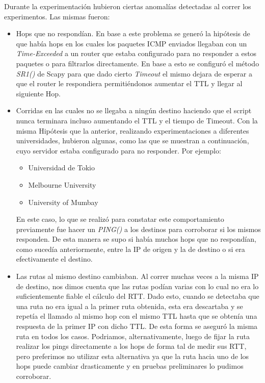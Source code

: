 Durante la experimentación hubieron ciertas anomalías detectadas al correr los experimentos. Las mismas fueron:

\begin{itemize}
    \item Hops que no respondían. En base a este problema se generó la hipótesis de que había hops en los cuales los paquetes ICMP enviados llegaban con un \textit{Time-Exceeded} a un router que estaba configurado para no responder a estos paquetes o para filtrarlos directamente. En base a esto se configuró el método \textit{SR1()} de Scapy para que dado cierto \textit{Timeout} el mismo dejara de esperar a que el router le respondiera permitiéndonos aumentar el TTL y llegar al siguiente Hop.
    
    \item Corridas en las cuales no se llegaba a ningún destino haciendo que el script nunca terminara incluso aumentando el TTL y el tiempo de Timeout. Con la misma Hipótesis que la anterior, realizando experimentaciones a diferentes universidades, hubieron algunas, como las que se muestran a continuación, cuyo servidor estaba configurado para no responder. Por ejemplo:
    \begin{itemize}
        \item Universidad de Tokio
        \item Melbourne University
        \item University of Mumbay
    \end{itemize}
    En este caso, lo que se realizó para constatar este comportamiento previamente fue hacer un \textit{PING()} a los destinos para corroborar si los mismos responden. De esta manera se supo si había muchos hops que no respondían, como sucedía anteriormente, entre la IP de origen y la de destino o si era efectivamente el destino.
    
    \item Las rutas al mismo destino cambiaban. Al correr muchas veces a la misma IP de destino, nos dimos cuenta que las rutas podían varias con lo cual no era lo suficientemente fiable el cálculo del RTT. Dado esto, cuando se detectaba que una ruta no era igual a la primer ruta obtenida, esta era descartaba y se repetía el llamado al mismo hop con el mismo TTL hasta que se obtenía una respuesta de la primer IP con dicho TTL. De esta forma se aseguró la misma ruta en todos los casos. Podriamos, alternativamente, luego de fijar la ruta realizar los pings directamente a los hops de forma tal de medir sus RTT, pero preferimos no utilizar esta alternativa ya que la ruta hacia uno de los hops puede cambiar drasticamente y en pruebas preliminares lo pudimos corroborar.
    

\end{itemize}
